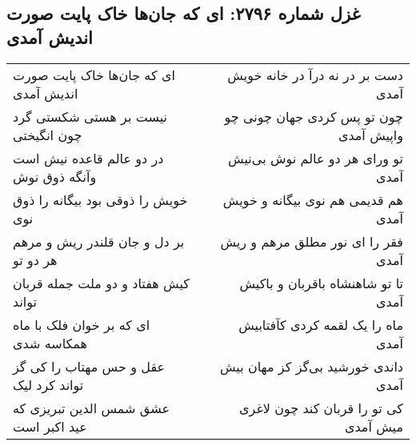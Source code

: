 \begin{center}
\section*{غزل شماره ۲۷۹۶: ای که جان‌ها خاک پایت صورت اندیش آمدی}
\label{sec:2796}
\begin{longtable}{l p{0.5cm} r}
ای که جان‌ها خاک پایت صورت اندیش آمدی
&&
دست بر در نه درآ در خانه خویش آمدی
\\
نیست بر هستی شکستی گرد چون انگیختی
&&
چون تو پس کردی جهان چونی چو واپیش آمدی
\\
در دو عالم قاعده نیش است وآنگه ذوق نوش
&&
تو ورای هر دو عالم نوش بی‌نیش آمدی
\\
خویش را ذوقی بود بیگانه را ذوق نوی
&&
هم قدیمی هم نوی بیگانه و خویش آمدی
\\
بر دل و جان قلندر ریش و مرهم هر دو تو
&&
فقر را ای نور مطلق مرهم و ریش آمدی
\\
کیش هفتاد و دو ملت جمله قربان تواند
&&
تا تو شاهنشاه باقربان و باکیش آمدی
\\
ای که بر خوان فلک با ماه همکاسه شدی
&&
ماه را یک لقمه کردی کآفتابیش آمدی
\\
عقل و حس مهتاب را کی گز تواند کرد لیک
&&
داندی خورشید بی‌گز کز مهان بیش آمدی
\\
عشق شمس الدین تبریزی که عید اکبر است
&&
کی تو را قربان کند چون لاغری میش آمدی
\\
\end{longtable}
\end{center}
